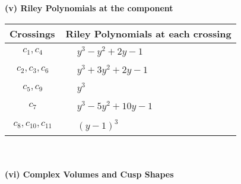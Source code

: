 \documentclass[1p]{elsarticle_modified}
\theoremstyle{definition}
\begin{document}
\newpage\renewcommand{\arraystretch}{1}
\flushleft \textbf{(v) Riley Polynomials at the component}\newline \\
\begin{tabular}{m{50pt}|m{274pt}}
Crossings & \hspace{64pt}Riley Polynomials at each crossing \\
\hline $$\begin{aligned}c_{1},c_{4}\end{aligned}$$&$\begin{aligned}
&y^3- y^2+2 y-1
\end{aligned}$\\
\hline $$\begin{aligned}c_{2},c_{3},c_{6}\end{aligned}$$&$\begin{aligned}
&y^3+3 y^2+2 y-1
\end{aligned}$\\
\hline $$\begin{aligned}c_{5},c_{9}\end{aligned}$$&$\begin{aligned}
&y^3
\end{aligned}$\\
\hline $$\begin{aligned}c_{7}\end{aligned}$$&$\begin{aligned}
&y^3-5 y^2+10 y-1
\end{aligned}$\\
\hline $$\begin{aligned}c_{8},c_{10},c_{11}\end{aligned}$$&$\begin{aligned}
&(y-1)^3
\end{aligned}$\\
\hline
\end{tabular}\\~\\
\newpage\flushleft \textbf{(vi) Complex Volumes and Cusp Shapes}
\end{document}
